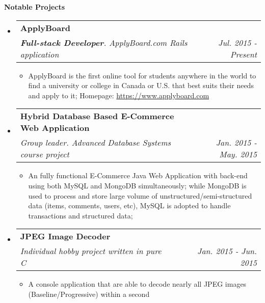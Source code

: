 \documentclass[letterpaper,10pt]{article}
\makeatletter
\newcommand{\resitem}[1]{\item #1 \vspace{-2pt}}
\newcommand{\resheading}[1]{{\large \colorbox{mygrey}{\begin{minipage}{\textwidth}{\textbf{#1 \vphantom{p\^{E}}}}\end{minipage}}}}
\newcommand{\ressubheading}[4]{
\begin{tabular*}{7.0in}{l@{\extracolsep{\fill}}r}
		\textbf{#1} & #2 \\
		\textit{#3} & \textit{#4} \\
\end{tabular*}\vspace{-6pt}}
\makeatother
\begin{document}
\resheading{Notable Projects}
\begin{itemize}
\itemsep0em
\item
    \ressubheading{ApplyBoard}{}{\textbf{Full-stack Developer}. ApplyBoard.com Rails application}{Jul. 2015 - Present}
	\begin{itemize}
		\resitem{ApplyBoard is the first online tool for students anywhere in the world to find a university or college in Canada or U.S. that best suits their needs and apply to it; Homepage: \url{https://www.applyboard.com}}
	\end{itemize}
\item
	\ressubheading{Hybrid Database Based E-Commerce Web Application}{}{Group leader. Advanced Database Systems course project}{Jan. 2015 - May. 2015}
	\begin{itemize}
		\resitem{An fully functional E-Commerce Java Web Application with back-end using both MySQL and MongoDB simultaneously; while MongoDB is used to process and store large volume of unstructured/semi-structured data (items, comments, users, etc), MySQL is adopted to handle transactions and structured data;}
	\end{itemize}
\item
	\ressubheading{JPEG Image Decoder}{}{Individual hobby project written in pure C}{Jan. 2015 - Jun. 2015}
	\begin{itemize}
		\resitem{A console application that are able to decode nearly all JPEG images (Baseline/Progressive) within a second}
	\end{itemize}
	
\end{itemize}
\end{document}
